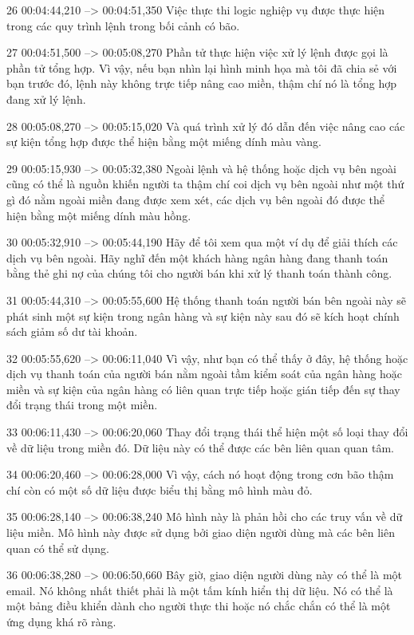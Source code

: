 26
00:04:44,210 --> 00:04:51,350
Việc thực thi logic nghiệp vụ được thực hiện trong các quy trình lệnh trong bối cảnh có bão.

27
00:04:51,500 --> 00:05:08,270
Phần tử thực hiện việc xử lý lệnh được gọi là phần tử tổng hợp.  Vì vậy, nếu bạn nhìn lại hình minh họa mà tôi đã chia sẻ với bạn trước đó, lệnh này không trực tiếp nâng cao miền, thậm chí nó là tổng hợp đang xử lý lệnh.

28
00:05:08,270 --> 00:05:15,020
Và quá trình xử lý đó dẫn đến việc nâng cao các sự kiện tổng hợp được thể hiện bằng một miếng dính màu vàng.

29
00:05:15,930 --> 00:05:32,380
Ngoài lệnh và hệ thống hoặc dịch vụ bên ngoài cũng có thể là nguồn khiến người ta thậm chí coi dịch vụ bên ngoài như một thứ gì đó nằm ngoài miền đang được xem xét, các dịch vụ bên ngoài đó được thể hiện bằng một miếng dính màu hồng.

30
00:05:32,910 --> 00:05:44,190
Hãy để tôi xem qua một ví dụ để giải thích các dịch vụ bên ngoài.  Hãy nghĩ đến một khách hàng ngân hàng đang thanh toán bằng thẻ ghi nợ của chúng tôi cho người bán khi xử lý thanh toán thành công.

31
00:05:44,310 --> 00:05:55,600
Hệ thống thanh toán người bán bên ngoài này sẽ phát sinh một sự kiện trong ngân hàng và sự kiện này sau đó sẽ kích hoạt chính sách giảm số dư tài khoản.

32
00:05:55,620 --> 00:06:11,040
Vì vậy, như bạn có thể thấy ở đây, hệ thống hoặc dịch vụ thanh toán của người bán nằm ngoài tầm kiểm soát của ngân hàng hoặc miền và sự kiện của ngân hàng có liên quan trực tiếp hoặc gián tiếp đến sự thay đổi trạng thái trong một miền.

33
00:06:11,430 --> 00:06:20,060
Thay đổi trạng thái thể hiện một số loại thay đổi về dữ liệu trong miền đó.  Dữ liệu này có thể được các bên liên quan quan tâm.

34
00:06:20,460 --> 00:06:28,000
Vì vậy, cách nó hoạt động trong cơn bão thậm chí còn có một số dữ liệu được biểu thị bằng mô hình màu đỏ.

35
00:06:28,140 --> 00:06:38,240
Mô hình này là phản hồi cho các truy vấn về dữ liệu miền.  Mô hình này được sử dụng bởi giao diện người dùng mà các bên liên quan có thể sử dụng.

36
00:06:38,280 --> 00:06:50,660
Bây giờ, giao diện người dùng này có thể là một email.  Nó không nhất thiết phải là một tấm kính hiển thị dữ liệu.  Nó có thể là một bảng điều khiển dành cho người thực thi hoặc nó chắc chắn có thể là một ứng dụng khá rõ ràng.


